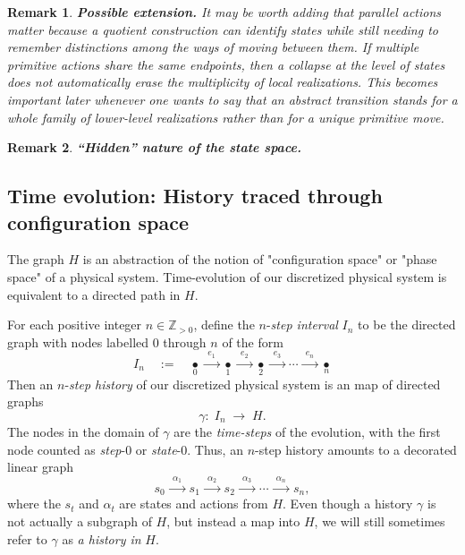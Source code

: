 \documentclass[11pt]{article}
\newtheorem{remark}{Remark}[subsection]
\begin{document}
{\color{blue}
\begin{remark}
{\bf Possible extension.}
\normalfont
It may be worth adding that parallel actions matter because a quotient construction can identify states while still needing to remember distinctions among the ways of moving between them. If multiple primitive actions share the same endpoints, then a collapse at the level of states does not automatically erase the multiplicity of local realizations. This becomes important later whenever one wants to say that an abstract transition stands for a whole family of lower-level realizations rather than for a unique primitive move.
\end{remark}
}

\begin{remark}
{\bf ``Hidden'' nature of the state space.}
\end{remark}

\subsection{Time evolution: History traced through configuration space}

The graph $H$ is an abstraction of the notion of "configuration space" or "phase space" of a physical system. Time-evolution of our discretized physical system is equivalent to a directed path in $H$.

For each positive integer $n\in\mathbb{Z}_{>0}$, define the $n$-{\em step interval} $I_{n}$ to be the directed graph with nodes labelled $0$ through $n$ of the form
$$
I_{n}\quad:=\quad
\underset{0}{\bullet}\xrightarrow{\ \ e_{1}\ \ }
\underset{1}{\bullet}\xrightarrow{\ \ e_2\ \ }
\underset{2}{\bullet}\xrightarrow{\ \ e_3\ \ }\cdots\xrightarrow{\ \ e_{n}\ \ }
\underset{n}{\bullet}
$$
Then an $n$-{\em step history} of our discretized physical system is an map of directed graphs
$$
\gamma:\; I_{n}\;\longrightarrow\;H.
$$
The nodes in the domain of $\gamma$ are the {\em time-steps} of the evolution, with the first node counted as {\em step}-$0$ or {\em state}-$0$. Thus, an $n$-step history amounts to a decorated linear graph
$$
s_{0}\xrightarrow{\ \ \alpha_1\ \ }s_{1}\xrightarrow{\ \ \alpha_2\ \ }s_{2}\xrightarrow{\ \ \alpha_3\ \ }\cdots\xrightarrow{\ \ \alpha_n\ \ }s_{n},
$$
where the $s_{t}$ and $\alpha_{t}$ are states and actions from $H$. Even though a history $\gamma$ is not actually a subgraph of $H$, but instead a map into $H$, we will still sometimes refer to $\gamma$ as {\em a history in} $H$.
\end{document}
